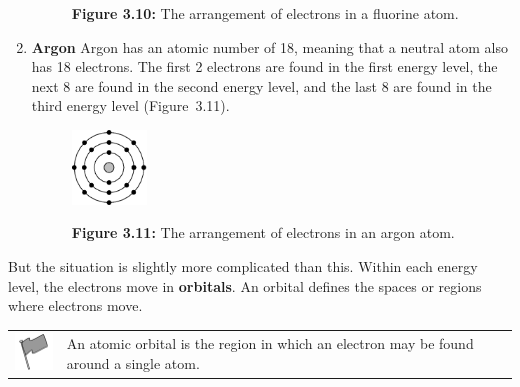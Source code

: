 \begin{enumerate}[noitemsep, label=\textbf{\arabic*}. ]
\begin{figure}[H]
\begin{center}
      \vspace{2pt}
    \vspace{\rubberspace}\par \begin{cnxcaption}
	  \small \textbf{Figure 3.10: }The arrangement of electrons in a fluorine atom.
	\end{cnxcaption}
    \vspace{.1in}
    \end{center}
 \end{figure}       \label{m38741*uid90}\item \textbf{Argon}
Argon has an atomic number of 18, meaning that a neutral atom also has 18 electrons. The first 2 electrons are found in the first energy level, the next 8 are found in the second energy level, and the last 8 are found in the third energy level (Figure~3.11).
    \setcounter{subfigure}{0}
	\begin{figure}[H] %
    \begin{center}
    \label{m38741*uid91!!!underscore!!!media}\label{m38741*uid91!!!underscore!!!printimage}\includegraphics[width=2cm]{col11305.imgs/m38741_CG10C3_007.png} %
      \vspace{2pt}
    \vspace{\rubberspace}\par \begin{cnxcaption}
	  \small \textbf{Figure 3.11: }The arrangement of electrons in an argon atom.
	\end{cnxcaption}
    \vspace{.1in}
    \end{center}
 \end{figure}       \end{enumerate}
\label{m38741*id259478}But the situation is slightly more complicated than this. Within each energy level, the electrons move in \textbf{orbitals}. An orbital defines the spaces or regions where electrons move.\par 
\label{m38741*fhsst!!!underscore!!!id687}\begin{definition}
	  \begin{tabular*}{15 cm}{m{15 mm}m{}}
	\hspace*{-50pt}  \includegraphics[width=0.5in]{col11305.imgs/psflag2.png}   & \Definition{   \label{id2420554}\textbf{ Atomic orbital }} { \label{m38741*meaningfhsst!!!underscore!!!id687}
        \label{m38741*id259495}An atomic orbital is the region in which an electron may be found around a single atom.
 \par 
         } 
      \end{tabular*}
      \end{definition}
